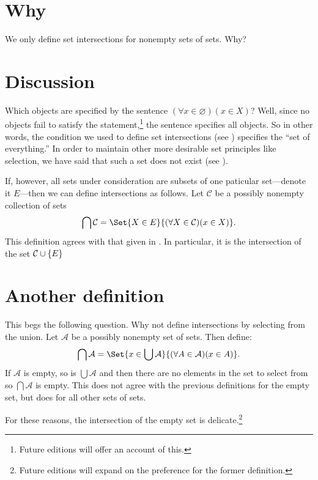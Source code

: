 
\section*{Why}

We only define set intersections for nonempty sets of sets.
Why?

\section*{Discussion}

Which objects are specified by the sentence $(\forall x \in \varnothing)(x \in X)$?
Well, since no objects fail to satisfy the statement,\footnote{Future editions will offer an account of this.}
the sentence specifies all objects.
So in other words, the condition we used to define set intersections (see ) specifies the ``set of everything.''
In order to maintain other more desirable set principles like selection, we have said that such a set does not exist (see ).

If, however, all sets under consideration are subsets of one paticular set---denote it $E$---then we can define intersections as follows.
Let $\mathcal{C} $ be a possibly nonempty collection of sets
\[
\bigcap \mathcal{C}  = \Set{X \in E}{(\forall X \in \mathcal{C} )(x \in X)}.
\]
This definition agrees with that given in .
In particular, it is the intersection of the set $\mathcal{C} \cup \{E\}$

\section*{Another definition}

This begs the following question.
Why not define intersections by selecting from the union.
Let $\mathcal{A} $ be a possibly nonempty set of sets.
Then define:
\[
\bigcap \mathcal{A}  = \Set{x \in \bigcup \mathcal{A} }{(\forall A \in \mathcal{A} )(x \in A)}.
\]
If $\mathcal{A} $ is empty, so is $\bigcup \mathcal{A} $ and then there are no elements in the set to select from so $\bigcap \mathcal{A} $ is empty.
This does not agree with the previous definitions for the empty set, but does for all other sets of sets.

For these reasons, the intersection of the empty set is delicate.\footnote{Future editions will expand on the preference for the former definition.}

\blankpage
